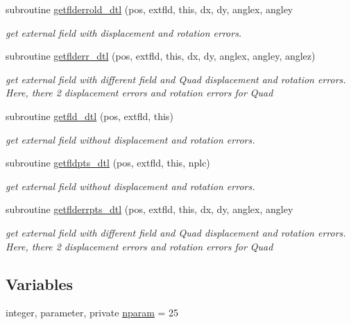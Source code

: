 \begin{DoxyCompactItemize}
\item 
subroutine \mbox{\hyperlink{namespacedtlclass_aa42e9d402234d9be025275b620c42326}{getflderrold\+\_\+dtl}} (pos, extfld, this, dx, dy, anglex, angley
\begin{DoxyCompactList}\small\item\em get external field with displacement and rotation errors. \end{DoxyCompactList}\item 
subroutine \mbox{\hyperlink{namespacedtlclass_ab866f108c00b307f9e7a55731eadafa4}{getflderr\+\_\+dtl}} (pos, extfld, this, dx, dy, anglex, angley, anglez)
\begin{DoxyCompactList}\small\item\em get external field with different field and Quad displacement and rotation errors. Here, there 2 displacement errors and rotation errors for Quad \end{DoxyCompactList}\item 
subroutine \mbox{\hyperlink{namespacedtlclass_a9e97d93c8f7ec49afee134e3ffd3f900}{getfld\+\_\+dtl}} (pos, extfld, this)
\begin{DoxyCompactList}\small\item\em get external field without displacement and rotation errors. \end{DoxyCompactList}\item 
subroutine \mbox{\hyperlink{namespacedtlclass_ad87e70265bf1286abf4b2976d8ac37ac}{getfldpts\+\_\+dtl}} (pos, extfld, this, nplc)
\begin{DoxyCompactList}\small\item\em get external field without displacement and rotation errors. \end{DoxyCompactList}\item 
subroutine \mbox{\hyperlink{namespacedtlclass_a34e4fef41e0eab9b94f596f73059c2b7}{getflderrpts\+\_\+dtl}} (pos, extfld, this, dx, dy, anglex, angley
\begin{DoxyCompactList}\small\item\em get external field with different field and Quad displacement and rotation errors. Here, there 2 displacement errors and rotation errors for Quad \end{DoxyCompactList}\end{DoxyCompactItemize}
\subsection*{Variables}
\begin{DoxyCompactItemize}
\item 
integer, parameter, private \mbox{\hyperlink{namespacedtlclass_adf04761c96168c3dc492c89c72194cea}{nparam}} = 25
\end{DoxyCompactItemize}


